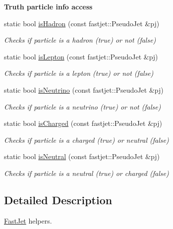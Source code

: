 \begin{Indent}{\bf Truth particle info access}
\begin{DoxyCompactItemize}
static bool \hyperlink{structAnalysisHelper_1_1FastJet_a1ea0e8cdbeeded3cbd2c2aef3647fc33}{is\+Hadron} (const fastjet\+::\+Pseudo\+Jet \&pj)
\begin{DoxyCompactList}\small\item\em Checks if particle is a hadron ({\ttfamily true}) or not ({\ttfamily false}) \end{DoxyCompactList}\item 
static bool \hyperlink{structAnalysisHelper_1_1FastJet_a2fd75d11fdfc60434c57467aa798e811}{is\+Lepton} (const fastjet\+::\+Pseudo\+Jet \&pj)
\begin{DoxyCompactList}\small\item\em Checks if particle is a lepton ({\ttfamily true}) or not ({\ttfamily false}) \end{DoxyCompactList}\item 
static bool \hyperlink{structAnalysisHelper_1_1FastJet_a06daab465ab6d937417c9c2e3c15ae34}{is\+Neutrino} (const fastjet\+::\+Pseudo\+Jet \&pj)
\begin{DoxyCompactList}\small\item\em Checks if particle is a neutrino ({\ttfamily true}) or not ({\ttfamily false}) \end{DoxyCompactList}\item 
static bool \hyperlink{structAnalysisHelper_1_1FastJet_aa0529ad04de358d2eafce2d62c13294c}{is\+Charged} (const fastjet\+::\+Pseudo\+Jet \&pj)
\begin{DoxyCompactList}\small\item\em Checks if particle is a charged ({\ttfamily true}) or neutral ({\ttfamily false}) \end{DoxyCompactList}\item 
static bool \hyperlink{structAnalysisHelper_1_1FastJet_adc293a40e376cd1ac951e66c9e43738e}{is\+Neutral} (const fastjet\+::\+Pseudo\+Jet \&pj)
\begin{DoxyCompactList}\small\item\em Checks if particle is a neutral ({\ttfamily true}) or charged ({\ttfamily false}) \end{DoxyCompactList}\end{DoxyCompactItemize}
\end{Indent}


\subsection{Detailed Description}
\hyperlink{structAnalysisHelper_1_1FastJet}{Fast\+Jet} helpers. 

